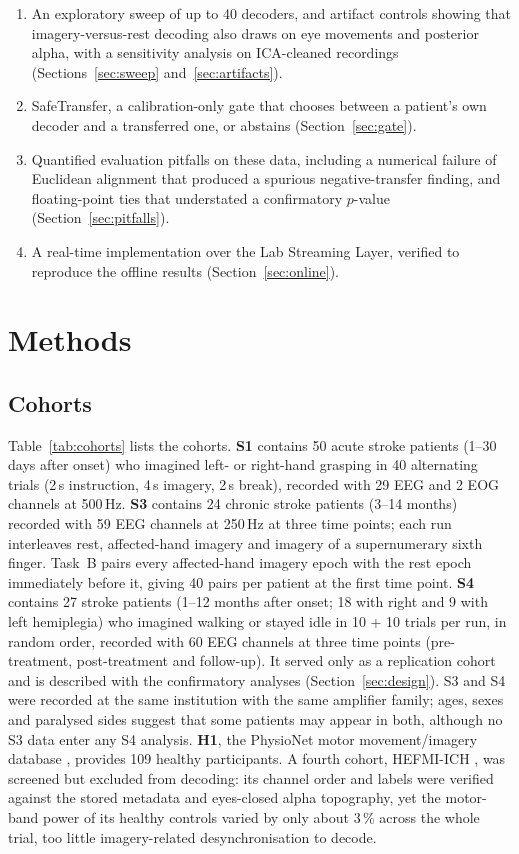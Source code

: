 \documentclass[11pt]{article}
\newcommand{\pct}{\,\%}
\begin{document}
\begin{enumerate}
  \item An exploratory sweep of up to 40 decoders, and artifact controls showing that imagery-versus-rest decoding also draws on eye movements and posterior alpha, with a sensitivity analysis on ICA-cleaned recordings (Sections~\ref{sec:sweep} and~\ref{sec:artifacts}).
  \item SafeTransfer, a calibration-only gate that chooses between a patient's own decoder and a transferred one, or abstains (Section~\ref{sec:gate}).
  \item Quantified evaluation pitfalls on these data, including a numerical failure of Euclidean alignment that produced a spurious negative-transfer finding, and floating-point ties that understated a confirmatory $p$-value (Section~\ref{sec:pitfalls}).
  \item A real-time implementation over the Lab Streaming Layer, verified to reproduce the offline results (Section~\ref{sec:online}).
\end{enumerate}

\section{Methods}

\subsection{Cohorts}

Table~\ref{tab:cohorts} lists the cohorts. \textbf{S1} \citep{liu2024} contains 50 acute stroke patients (1--30 days after onset) who imagined left- or right-hand grasping in 40 alternating trials (2\,s instruction, 4\,s imagery, 2\,s break), recorded with 29 EEG and 2 EOG channels at 500\,Hz. \textbf{S3} \citep{wang2026} contains 24 chronic stroke patients (3--14 months) recorded with 59 EEG channels at 250\,Hz at three time points; each run interleaves rest, affected-hand imagery and imagery of a supernumerary sixth finger. Task~B pairs every affected-hand imagery epoch with the rest epoch immediately before it, giving 40 pairs per patient at the first time point. \textbf{S4} \citep{liu2025gait} contains 27 stroke patients (1--12 months after onset; 18 with right and 9 with left hemiplegia) who imagined walking or stayed idle in 10 + 10 trials per run, in random order, recorded with 60 EEG channels at three time points (pre-treatment, post-treatment and follow-up). It served only as a replication cohort and is described with the confirmatory analyses (Section~\ref{sec:design}). S3 and S4 were recorded at the same institution with the same amplifier family; ages, sexes and paralysed sides suggest that some patients may appear in both, although no S3 data enter any S4 analysis. \textbf{H1}, the PhysioNet motor movement/imagery database \citep{schalk2004,goldberger2000}, provides 109 healthy participants. A fourth cohort, HEFMI-ICH \citep{shi2025}, was screened but excluded from decoding: its channel order and labels were verified against the stored metadata and eyes-closed alpha topography, yet the motor-band power of its healthy controls varied by only about 3\pct{} across the whole trial, too little imagery-related desynchronisation to decode.
\end{document}
